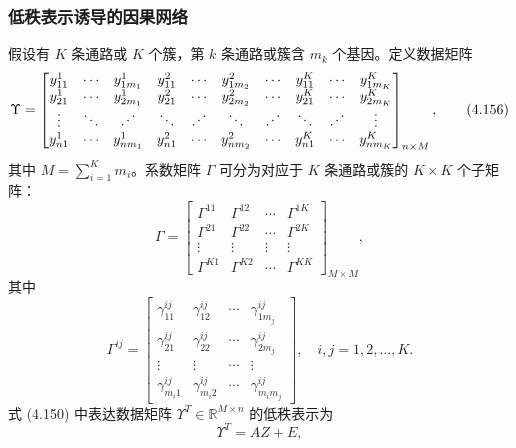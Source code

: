 \providecommand{\chFourAProj}{\bigl[I_{r_i}\otimes X(X^TX)^{-1}X^T\bigr]}
\providecommand{\chFourARisingDots}{\reflectbox{\ensuremath{\ddots}}}
\subsubsection{低秩表示诱导的因果网络}
假设有 $K$ 条通路或 $K$ 个簇，第 $k$ 条通路或簇含 $m_k$ 个基因。定义数据矩阵
\begin{equation}
\Upsilon=\begin{bmatrix}
y_{11}^1&\cdots&y_{1m_1}^1&y_{11}^2&\cdots&y_{1m_2}^2&\cdots&y_{11}^K&\cdots&y_{1m_K}^K\\
y_{21}^1&\cdots&y_{2m_1}^1&y_{21}^2&\cdots&y_{2m_2}^2&\cdots&y_{21}^K&\cdots&y_{2m_K}^K\\
\vdots&\ddots&\chFourARisingDots&\ddots&\chFourARisingDots&\ddots&\chFourARisingDots&\ddots&\chFourARisingDots&\vdots\\
y_{n1}^1&\cdots&y_{nm_1}^1&y_{n1}^2&\cdots&y_{nm_2}^2&\cdots&y_{n1}^K&\cdots&y_{nm_K}^K
\end{bmatrix}_{n\times M},
\tag{4.156}
\end{equation}
其中 $M=\sum_{i=1}^{K}m_i$。系数矩阵 $\Gamma$ 可分为对应于 $K$ 条通路或簇的 $K\times K$ 个子矩阵：
\begin{equation}
\Gamma=\begin{bmatrix}
\Gamma^{11}&\Gamma^{12}&\cdots&\Gamma^{1K}\\
\Gamma^{21}&\Gamma^{22}&\cdots&\Gamma^{2K}\\
\vdots&\vdots&\vdots&\vdots\\
\Gamma^{K1}&\Gamma^{K2}&\cdots&\Gamma^{KK}
\end{bmatrix}_{M\times M},
\tag{4.157}
\end{equation}
其中
\begin{equation}
\Gamma^{ij}=\begin{bmatrix}
\gamma_{11}^{ij}&\gamma_{12}^{ij}&\cdots&\gamma_{1m_j}^{ij}\\
\gamma_{21}^{ij}&\gamma_{22}^{ij}&\cdots&\gamma_{2m_j}^{ij}\\
\vdots&\vdots&\cdots&\vdots\\
\gamma_{m_i1}^{ij}&\gamma_{m_i2}^{ij}&\cdots&\gamma_{m_im_j}^{ij}
\end{bmatrix},\quad i,j=1,2,\ldots,K.
\tag{4.158}
\end{equation}
式 (4.150) 中表达数据矩阵 $\Upsilon^T\in\mathbb R^{M\times n}$ 的低秩表示为
\begin{equation}
\Upsilon^T=AZ+E,
\tag{4.159}
\end{equation}
